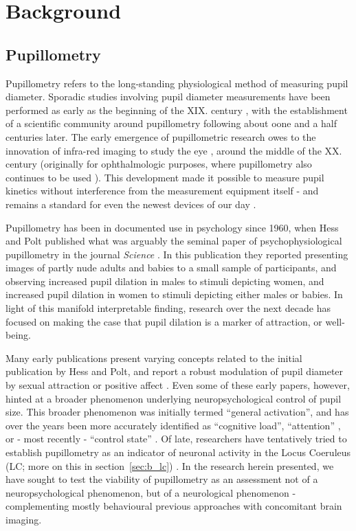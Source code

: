 \chapter{Background}
    \section{Pupillometry}\label{sec:b_p}
	Pupillometry refers to the long-standing physiological method of measuring pupil diameter.
	Sporadic studies involving pupil diameter measurements have been performed as early as the beginning of the XIX. century \cite{Loewenfeld1958},
	with the establishment of a scientific community around pupillometry following about oone and a half centuries later.
	The early emergence of pupillometric research owes to the innovation of infra-red imaging to study the eye \cite{Dubois1955}, around the middle of the XX. century (originally for ophthalmologic purposes, where pupillometry also continues to be used \cite{Thompson2012}).
	This development made it possible to measure pupil kinetics without interference from the measurement equipment itself - and remains a standard for even the newest devices of our day \cite{Bradley2010}.
	
	Pupillometry has been in documented use in psychology since 1960, when Hess and Polt published what was arguably the seminal paper of psychophysiological pupillometry in the journal \textit{Science} \cite{HESS1960}.
	In this publication they reported presenting images of partly nude adults and babies to a small sample of participants, and observing increased pupil dilation in males to stimuli depicting women, and increased pupil dilation in women to stimuli depicting either males or babies.
	In light of this manifold interpretable finding, research over the next decade has focused on making the case that pupil dilation is a marker of attraction, or well-being.
	
	Many early publications present varying concepts related to the initial publication by Hess and Polt, and report a robust modulation of pupil diameter by sexual attraction \cite{Goldwater1972, HESS1965} or positive affect \cite{Nunally1967, Bradshaw1967}.
	Even some of these early papers, however, hinted at a broader phenomenon underlying neuropsychological control of pupil size.
	This broader phenomenon was initially termed “general activation”\cite{Nunally1967}, and has over the years been more accurately identified as “cognitive load”\cite{Zekveld2011}, “attention” \cite{Wykowska2013,Kraemer2000}, or - most recently - “control state” \cite{Hayes2013}.
	Of late, researchers have tentatively tried to establish pupillometry as an indicator of neuronal activity in the Locus Coeruleus (LC; more on this in section~\ref{sec:b_lc}) \cite{Gilzenrat2010}.
	In the research herein presented, we have sought to test the viability of pupillometry as an assessment not of a neuropsychological phenomenon, but of a neurological phenomenon - 
	complementing mostly behavioural previous approaches\cite{Gilzenrat2010,Granholm2004} with concomitant brain imaging.
	
